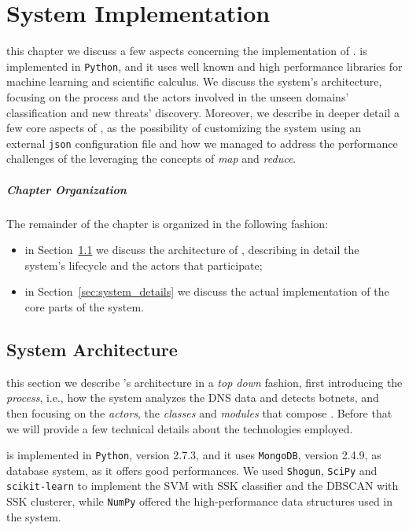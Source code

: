 
\chapter{System Implementation} %
\label{chap:implementation}
 this chapter we discuss a few aspects concerning the implementation
of \thesystem. \thesystem is implemented in \texttt{Python}, and it uses
well known and high performance libraries for machine learning and scientific
calculus.
We discuss the system's architecture,
focusing on the process and the actors involved in the unseen domains'
classification and new threats' discovery. Moreover, we describe in deeper
detail a few core aspects of \thesystem, as the possibility of customizing
the system using an external \texttt{json} configuration file and how
we managed to address the performance challenges of the  leveraging the concepts of \emph{map} and \emph{reduce}.

\paragraph{Chapter Organization} The remainder of the chapter is organized in
the following fashion:
\begin{itemize}
    \item in Section~\ref{sec:system_architecture} we discuss the architecture
        of \thesystem, describing in detail the system's lifecycle and the
        actors that participate;
    \item in Section~\ref{sec:system_details} we discuss the actual implementation
        of the core parts of the system.
\end{itemize}

\newpage

\section{System Architecture} %
\label{sec:system_architecture}
 this section we describe \thesystem's architecture
in a \emph{top down} fashion, first introducing the \emph{process}, i.e., how
the system analyzes the DNS data and detects botnets, and then
focusing on the \emph{actors}, the \emph{classes} and \emph{modules} that
compose \thesystem.
Before that we will provide a few technical details about the  technologies employed.

\thesystem is implemented in \texttt{Python},
version 2.7.3, and it uses \texttt{MongoDB}, version 2.4.9, as database system,
as it offers good performances. We used \texttt{Shogun}, \texttt{SciPy} and \texttt{scikit-learn} to implement the SVM with SSK classifier and the DBSCAN with SSK
clusterer, while \texttt{NumPy} offered the high-performance data structures
used in the system.

